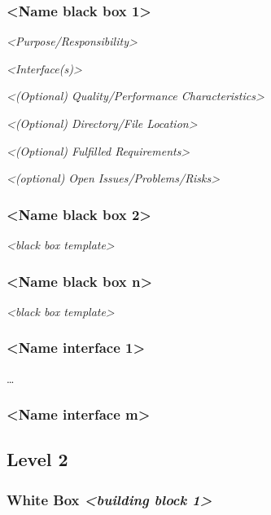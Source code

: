 \subsubsection{\textless{}Name black box
1\textgreater{}}\label{__name_black_box_1}

\emph{\textless{}Purpose/Responsibility\textgreater{}}

\emph{\textless{}Interface(s)\textgreater{}}

\emph{\textless{}(Optional) Quality/Performance
Characteristics\textgreater{}}

\emph{\textless{}(Optional) Directory/File Location\textgreater{}}

\emph{\textless{}(Optional) Fulfilled Requirements\textgreater{}}

\emph{\textless{}(optional) Open Issues/Problems/Risks\textgreater{}}

\subsubsection{\textless{}Name black box
2\textgreater{}}\label{__name_black_box_2}

\emph{\textless{}black box template\textgreater{}}

\subsubsection{\textless{}Name black box
n\textgreater{}}\label{__name_black_box_n}

\emph{\textless{}black box template\textgreater{}}

\subsubsection{\textless{}Name interface
1\textgreater{}}\label{__name_interface_1}

\ldots{}

\subsubsection{\textless{}Name interface
m\textgreater{}}\label{__name_interface_m}

\subsection{Level 2}\label{_level_2}

\subsubsection{\texorpdfstring{White Box \emph{\textless{}building block
1\textgreater{}}}{White Box \textless{}building block 1\textgreater{}}}\label{_white_box_emphasis_building_block_1_emphasis}

